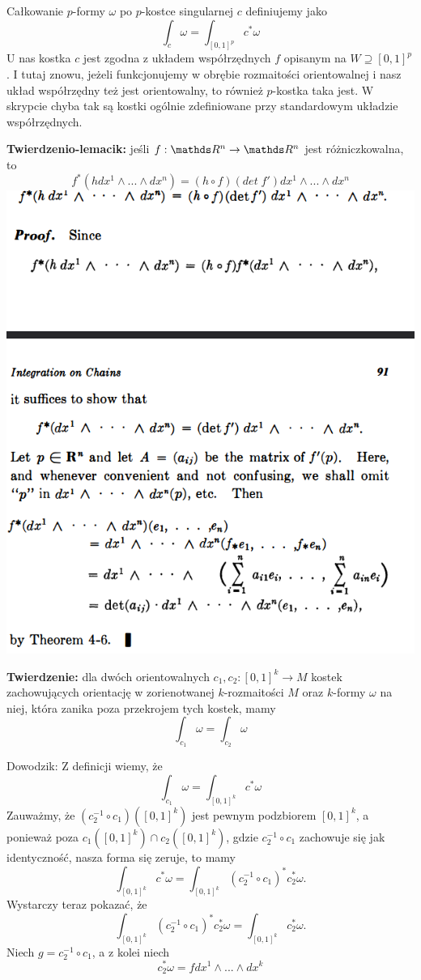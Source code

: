 \documentclass{article}
\begin{document}
Całkowanie $p$-formy $\omega$ po $p$-kostce singularnej $c$ definiujemy jako
$$\int_c\omega=\int_{[0,1]^p}c^*\omega$$
U nas kostka $c$ jest zgodna z układem współrzędnych $f$ opisanym na $W\supseteq[0,1]^p$. I tutaj znowu, jeżeli funkcjonujemy w obrębie rozmaitości orientowalnej i nasz układ współrzędny też jest orientowalny, to również $p$-kostka taka jest. W skrypcie chyba tak są kostki ogólnie zdefiniowane przy standardowym układzie współrzędnych.
\medskip

\textbf{\large\color{def}Twierdzenio-lemacik:} jeśli $f:\R^n\to\R^n$ jest różniczkowalna, to
$$f^*(hdx^1\land...\land dx^n)=(h\circ f)(det\;f')dx^1\land...\land dx^n$$
\includegraphics[width=\textwidth]{4.9.png}

\textbf{\large\color{acc}Twierdzenie:} dla dwóch orientowalnych $c_1,c_2:[0,1]^k\to M$ kostek zachowujących orientację w zorienotwanej $k$-rozmaitości $M$ oraz $k$-formy $\omega$ na niej, która zanika poza przekrojem tych kostek, mamy
$$\int_{c_1}\omega=\int_{c_2}\omega$$

{\color{acc}Dowodzik:} Z definicji wiemy, że
$$\int_{c_1}\omega=\int_{[0,1]^k}c^*\omega$$
Zauważmy, że $(c_2^{-1}\circ c_1)([0,1]^k)$ jest pewnym podzbiorem $[0,1]^k$, a ponieważ poza $c_1([0,1]^k)\cap c_2([0,1]^k)$, gdzie $c_2^{-1}\circ c_1$ zachowuje się jak identyczność, nasza forma się zeruje, to mamy
$$\int_{[0,1]^k}c^*\omega=\int_{[0,1]^k}(c_2^{-1}\circ c_1)^*c_2^*\omega.$$
Wystarczy teraz pokazać, że 
$$\int_{[0,1]^k}(c_2^{-1}\circ c_1)^*c_2^*\omega=\int_{[0,1]^k}c_2^*\omega.$$
Niech $g=c_2^{-1}\circ c_1$, a z kolei niech
$$c_2^*\omega=fdx^1\land...\land dx^k$$
\end{document}
